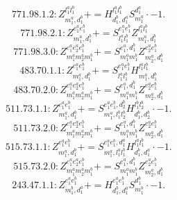 \documentclass[letterpaper,10pt,fleqn,leqno,onecolumn]{article}
\begin{document}
\begin{equation} \;\;\;\;\;\;  771.98.1.2: Z^{l_{1}^{a}l_{1}^{b}}_{m_{1}^{a},d_{1}^{b}}+=H^{l_{1}^{a}l_{1}^{b}}_{d_{1}^{b},d_{1}^{a}}S^{d_{1}^{a}}_{m_{1}^{a}}\cdot -1. \end{equation}
\begin{equation} \;\;\;\;\;\;  771.98.2.1: Z^{e_{1}^{a}e_{1}^{b}}_{m_{1}^{a},d_{1}^{b}}+=S^{e_{1}^{a}e_{1}^{b}}_{l_{1}^{a}l_{1}^{b}}Z^{l_{1}^{a}l_{1}^{b}}_{m_{1}^{a},d_{1}^{b}} \end{equation}
\begin{equation} \;\;\;\;\;\;  771.98.3.0: Z^{e_{1}^{a}e_{2}^{a}e_{1}^{b}}_{m_{1}^{a}m_{2}^{a}m_{1}^{b}}+=S^{e_{1}^{a},d_{1}^{b}}_{m_{1}^{a}m_{1}^{b}}Z^{e_{2}^{a}e_{1}^{b}}_{m_{2}^{a},d_{1}^{b}} \end{equation}
\begin{equation} \;\;\;\;\;\;  483.70.1.1: Z^{e_{1}^{a}e_{1}^{b}}_{m_{1}^{a},d_{1}^{b}}+=S^{e_{1}^{a}e_{1}^{b}}_{l_{1}^{a}l_{1}^{b}}H^{l_{1}^{a}l_{1}^{b}}_{m_{1}^{a},d_{1}^{b}} \end{equation}
\begin{equation} \;\;\;\;\;\;  483.70.2.0: Z^{e_{1}^{a}e_{2}^{a}e_{1}^{b}}_{m_{1}^{a}m_{2}^{a}m_{1}^{b}}+=S^{e_{1}^{a},d_{1}^{b}}_{m_{1}^{a}m_{1}^{b}}Z^{e_{2}^{a}e_{1}^{b}}_{m_{2}^{a},d_{1}^{b}} \end{equation}
\begin{equation} \;\;\;\;\;\;  511.73.1.1: Z^{e_{1}^{a}e_{1}^{b}}_{m_{1}^{a},d_{1}^{b}}+=S^{e_{1}^{a}e_{1}^{b},d_{2}^{b}}_{m_{1}^{a},l_{1}^{b}l_{2}^{b}}H^{l_{1}^{b}l_{2}^{b}}_{d_{1}^{b},d_{2}^{b}}\cdot -1. \end{equation}
\begin{equation} \;\;\;\;\;\;  511.73.2.0: Z^{e_{1}^{a}e_{2}^{a}e_{1}^{b}}_{m_{1}^{a}m_{2}^{a}m_{1}^{b}}+=S^{e_{1}^{a},d_{1}^{b}}_{m_{1}^{a}m_{1}^{b}}Z^{e_{2}^{a}e_{1}^{b}}_{m_{2}^{a},d_{1}^{b}} \end{equation}
\begin{equation} \;\;\;\;\;\;  515.73.1.1: Z^{e_{1}^{a}e_{1}^{b}}_{m_{1}^{a},d_{1}^{b}}+=S^{e_{1}^{a}e_{1}^{b},d_{1}^{a}}_{m_{1}^{a},l_{1}^{a}l_{1}^{b}}H^{l_{1}^{a}l_{1}^{b}}_{d_{1}^{b},d_{1}^{a}}\cdot -1. \end{equation}
\begin{equation} \;\;\;\;\;\;  515.73.2.0: Z^{e_{1}^{a}e_{2}^{a}e_{1}^{b}}_{m_{1}^{a}m_{2}^{a}m_{1}^{b}}+=S^{e_{1}^{a},d_{1}^{b}}_{m_{1}^{a}m_{1}^{b}}Z^{e_{2}^{a}e_{1}^{b}}_{m_{2}^{a},d_{1}^{b}} \end{equation}
\begin{equation} \;\;\;\;\;\;  243.47.1.1: Z^{e_{1}^{a}e_{1}^{b}}_{m_{1}^{b},d_{1}^{a}}+=H^{e_{1}^{a}e_{1}^{b}}_{d_{1}^{b},d_{1}^{a}}S^{d_{1}^{b}}_{m_{1}^{b}}\cdot -1. \end{equation}
\end{document}
